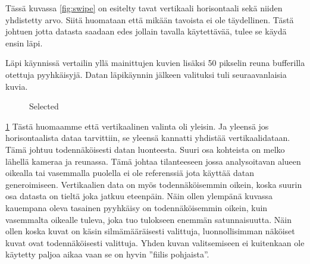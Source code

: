 Tässä kuvassa \ref{fig:swipe} on esitelty tavat vertikaali horisontaali sekä niiden yhdistetty arvo. 
Siitä huomataan että mikään tavoista ei ole täydellinen. Tästä johtuen jotta datasta saadaan edes jollain tavalla käytettävää, tulee se käydä ensin läpi. 

Läpi käynnissä vertailin yllä mainittujen kuvien lisäksi 50 pikselin reuna bufferilla otettuja pyyhkäisyjä. Datan läpikäynnin jälkeen valituksi tuli seuraavanlaisia kuvia.

\begin{figure}[h]
\centering
{}
\caption{Selected}
\label{fig:selected}
\end{figure}

\ref{fig:selected} 
Tästä huomaamme että vertikaalinen valinta oli yleisin.
Ja yleensä jos horisontaalista dataa tarvittiin, se yleensä kannatti yhdistää vertikaalidataan.
Tämä johtuu todennäköisesti datan luonteesta. Suuri osa kohteista on melko lähellä kameraa ja reunassa.
Tämä johtaa tilanteeseen jossa analysoitavan alueen oikealla tai vasemmalla puolella ei ole referenssiä jota käyttää datan generoimiseen.
Vertikaalien data on myös todennäköisemmin oikein, koska suurin osa datasta on tieltä joka jatkuu eteenpäin.
Näin ollen ylempänä kuvassa kauempana oleva tasainen pyyhkäisy on todennäköisemmin oikein, kuin vasemmalta oikealle tuleva, joka tuo tulokseen enemmän satunnaisuutta.
Näin ollen koska kuvat on käsin silmämääräisesti valittuja, luonnollisimman näköiset kuvat ovat todennäköisesti valittuja.
Yhden kuvan valitsemiseen ei kuitenkaan ole käytetty paljoa aikaa vaan se on hyvin ”fiilis pohjaista”.

